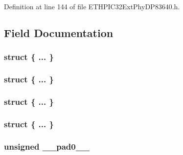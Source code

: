 Definition at line 144 of file E\+T\+H\+P\+I\+C32\+Ext\+Phy\+D\+P83640.\+h.



\subsection{Field Documentation}
\hypertarget{union_____r_m_i_i_b_y_p_a_s_sbits__t_a366fa38305ac2f1757e4d556e28901e1}{}\subsubsection[{"@156}]{\setlength{\rightskip}{0pt plus 5cm}struct \{ ... \} }\label{union_____r_m_i_i_b_y_p_a_s_sbits__t_a366fa38305ac2f1757e4d556e28901e1}
\hypertarget{union_____r_m_i_i_b_y_p_a_s_sbits__t_ab96cf21fdfcbfb5558005b5090709f95}{}\subsubsection[{"@158}]{\setlength{\rightskip}{0pt plus 5cm}struct \{ ... \} }\label{union_____r_m_i_i_b_y_p_a_s_sbits__t_ab96cf21fdfcbfb5558005b5090709f95}
\hypertarget{union_____r_m_i_i_b_y_p_a_s_sbits__t_ad420ae08b121c799ceff3a2d2310725e}{}\subsubsection[{"@164}]{\setlength{\rightskip}{0pt plus 5cm}struct \{ ... \} }\label{union_____r_m_i_i_b_y_p_a_s_sbits__t_ad420ae08b121c799ceff3a2d2310725e}
\hypertarget{union_____r_m_i_i_b_y_p_a_s_sbits__t_ab8d8691f5c36648fb9be84230c3faf1f}{}\subsubsection[{"@166}]{\setlength{\rightskip}{0pt plus 5cm}struct \{ ... \} }\label{union_____r_m_i_i_b_y_p_a_s_sbits__t_ab8d8691f5c36648fb9be84230c3faf1f}
\hypertarget{union_____r_m_i_i_b_y_p_a_s_sbits__t_adf71f3d8410c1f1dbbc96680a92c49af}{}
\subsubsection[{\+\_\+\+\_\+pad0\+\_\+\+\_\+}]{\setlength{\rightskip}{0pt plus 5cm}unsigned \+\_\+\+\_\+pad0\+\_\+\+\_\+}\label{union_____r_m_i_i_b_y_p_a_s_sbits__t_adf71f3d8410c1f1dbbc96680a92c49af}


